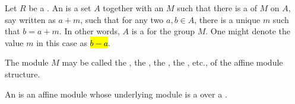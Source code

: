 \begin{definition} \label{definition:affine_module_over_a_ring}
    Let $R$ be a . 
    An  is a set $A$ together with an  $M$ such that there is a  of $M$ on $A$, say written as $a + m$, such that for any two $a,b \in A$, there is a unique $m$ such that $b = a+m$. In other words, $A$ is a  for the group $M$. One might denote the value $m$ in this case as \hl{$b - a$}.
    
    The module $M$ may be called the , the , the , the , etc., of the affine module structure.

    An  is an affine module whose underlying module is a  over a .
\end{definition}